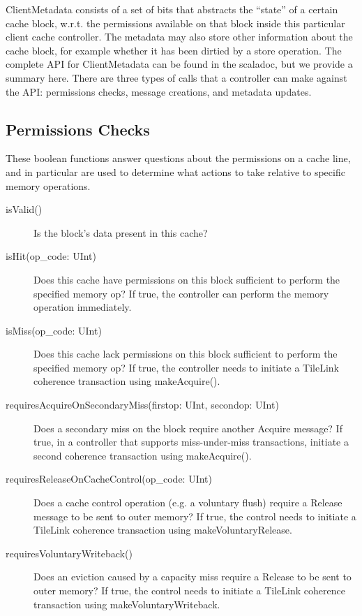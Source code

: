 ClientMetadata consists of a set of bits that abstracts the “state” of a certain cache block,
w.r.t. the permissions available on that block inside this particular client cache controller.
The metadata may also store other information about the cache block,
for example whether it has been dirtied by a store operation.
The complete API for ClientMetadata can be found in the scaladoc, but we provide a summary here.
There are three types of calls that a controller can make against the API:
permissions checks, message creations, and metadata updates.

\subsection{Permissions Checks}


These boolean functions answer questions about the permissions on a cache line, and in particular are used to determine what actions to take relative to specific memory operations.

\begin{description}
\item[isValid()]
Is the block's data present in this cache?
\item[isHit(op\_code: UInt)]
Does this cache have permissions on this block sufficient to perform the specified memory op?
If true, the controller can perform the memory operation immediately.
\item[isMiss(op\_code: UInt)]
Does this cache lack permissions on this block sufficient to perform the specified memory op?
If true, the controller needs to initiate a TileLink coherence transaction using makeAcquire().
\item[requiresAcquireOnSecondaryMiss(firstop: UInt, secondop: UInt)]
Does a secondary miss on the block require another Acquire message?
If true, in a controller that supports miss-under-miss transactions, initiate a second coherence transaction using makeAcquire().
\item[requiresReleaseOnCacheControl(op\_code: UInt)]
Does a cache control operation (e.g. a voluntary flush) require a Release message to be sent to outer memory?
If true, the control needs to initiate a TileLink coherence transaction using makeVoluntaryRelease.
\item[requiresVoluntaryWriteback()]
Does an eviction caused by a capacity miss require a Release to be sent to outer memory?
If true, the control needs to initiate a TileLink coherence transaction using makeVoluntaryWriteback.
\end{description}


